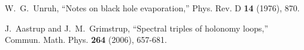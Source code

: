 \documentclass[12pt]{article}
\begin{document}
\begin{thebibliography}{99}
  






W.~G.~Unruh,
``Notes on black hole evaporation,''
Phys. Rev. D \textbf{14} (1976), 870.





J.~Aastrup and J.~M.~Grimstrup,
``Spectral triples of holonomy loops,''
Commun. Math. Phys. \textbf{264} (2006), 657-681.







\end{thebibliography}
\end{document}
